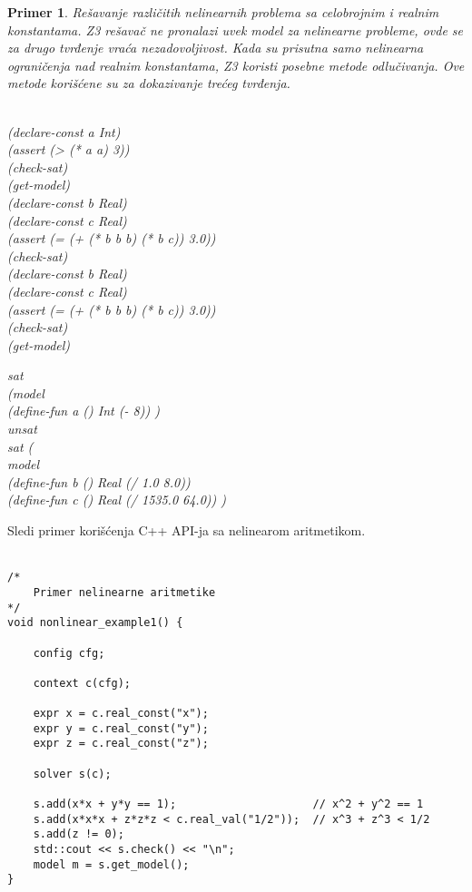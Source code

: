 \documentclass[12pt,oneside]{memoir}
\newtheorem{primer}{Primer}
\begin{document}
\begin{primer} Rešavanje različitih nelinearnih problema sa celobrojnim i realnim konstantama. Z3 rešavač ne pronalazi uvek model za nelinearne probleme, ovde se za drugo tvrđenje vraća nezadovoljivost. Kada su prisutna samo nelinearna ograničenja nad realnim konstantama, Z3 koristi posebne metode odlučivanja. Ove metode korišćene su za dokazivanje trećeg tvrđenja.\\ \\
\begin{minipage}[b]{0.4\textwidth}
(declare-const a Int)
\\(assert (> (* a a) 3))
\\(check-sat)
\\(get-model)
\\(declare-const b Real)
\\(declare-const c Real)
\\(assert (= (+ (* b b b) (* b c)) 3.0))
\\(check-sat)
\\(declare-const b Real)
\\(declare-const c Real)
\\(assert (= (+ (* b b b) (* b c)) 3.0))
\\(check-sat)
\\(get-model)

\end{minipage}
\hspace{1.5cm}
\begin{minipage}[t]{0.4\textwidth}
\vspace{-9cm}
sat 
\\(model 
\\(define-fun a () Int (- 8)) ) 
\\unsat 
\\sat (
\\model 
\\(define-fun b () Real (/ 1.0 8.0)) 
\\(define-fun c () Real (/ 1535.0 64.0)) )
\end{minipage}
\end{primer}
Sledi primer korišćenja C++ API-ja sa nelinearom aritmetikom. 
\\ \\
\begin{lstlisting}
/*
	Primer nelinearne aritmetike
*/
void nonlinear_example1() {

    config cfg;

    context c(cfg);

    expr x = c.real_const("x");
    expr y = c.real_const("y");
    expr z = c.real_const("z");
                     
    solver s(c);

    s.add(x*x + y*y == 1);                     // x^2 + y^2 == 1
    s.add(x*x*x + z*z*z < c.real_val("1/2"));  // x^3 + z^3 < 1/2
    s.add(z != 0);
    std::cout << s.check() << "\n";
    model m = s.get_model();
}

\end{lstlisting}
\end{document}
